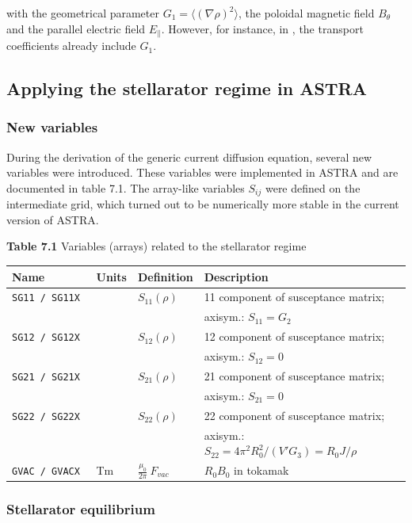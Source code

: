 with the geometrical parameter $G_1 = \langle (\nabla \rho)^2 \rangle$, the poloidal magnetic field $B_\theta$ and the parallel electric field $E_\parallel$. However, for instance, in \cite{turkin2011}, the transport coefficients already include $G_1$.


\subsection{Applying the stellarator regime in ASTRA}

\subsubsection{New variables}

During the derivation of the generic current diffusion equation, several new variables were introduced. These variables were implemented in ASTRA and are documented in table 7.1. The array-like variables $S_{ij}$ were defined on the intermediate grid, which turned out to be numerically more stable in the current version of ASTRA.

{\bf Table 7.1} Variables (arrays) related to the stellarator regime\\[2ex]
\begin{tabular}{|l|l|l|l|}				\hline
\bf Name	&\bf Units & Definition & Description\\ \hline
\tt SG11 / SG11X	&  & $S_{11}(\rho)$ & 11 component of susceptance matrix; \\
&&&axisym.: $S_{11} = G_2$\\
\tt SG12 / SG12X	&  & $S_{12}(\rho)$ & 12 component of susceptance matrix; \\
&&&axisym.: $S_{12} = 0$\\
\tt SG21 / SG21X	&  & $S_{21}(\rho)$ & 21 component of susceptance matrix; \\
&&&axisym.: $S_{21} = 0$\\
\tt SG22 / SG22X	&  & $S_{22}(\rho)$ & 22 component of susceptance matrix; \\
&&&axisym.: $S_{22} = 4 \pi^2 R^2_0/(V' G_{3}) = R_0 J/\rho$\\
\tt GVAC / GVACX	& Tm	& $\frac{\mu_0}{2\pi} \ F_{vac}$ & $R_0 B_0$ in tokamak\\
\hline
\end{tabular}
\bigskip

\subsubsection{Stellarator equilibrium}

